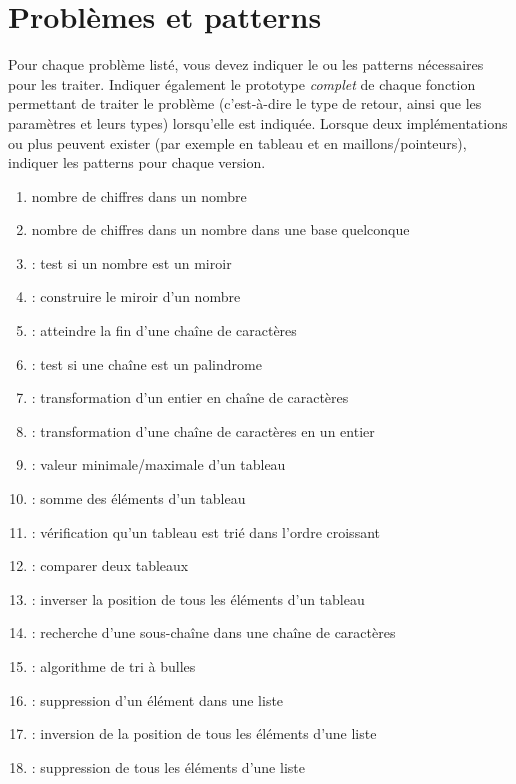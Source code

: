 \documentclass[11pt,a4paper]{article}
\begin{document}
\clearpage

\section{Problèmes et patterns}


Pour chaque problème listé, vous devez indiquer le ou les patterns nécessaires pour les traiter.
Indiquer également le prototype \textit{complet} de chaque fonction permettant de traiter le problème (c'est-à-dire le type de retour, ainsi que les paramètres et leurs types) lorsqu'elle est indiquée.
Lorsque deux implémentations ou plus peuvent exister (par exemple en tableau et en maillons/pointeurs), indiquer les patterns pour chaque version.

\bigskip

\begin{enumerate}
\item nombre de chiffres dans un nombre
\item nombre de chiffres dans un nombre dans une base quelconque
\item {} : test si un nombre est un miroir
\item {} : construire le miroir d'un nombre
\item {} : atteindre la fin d'une chaîne de caractères
\item {} : test si une chaîne est un palindrome
\item {} : transformation d'un entier en chaîne de caractères
\item {} : transformation d'une chaîne de caractères en un entier
\item {} : valeur minimale/maximale d'un tableau
\item {} : somme des éléments d'un tableau
\item {} : vérification qu'un tableau est trié dans l'ordre croissant
\item {} : comparer deux tableaux
\item {} : inverser la position de tous les éléments d'un tableau
\item {} : recherche d'une sous-chaîne dans une chaîne de caractères
\item {} : algorithme de tri à bulles
\item {} : suppression d'un élément dans une liste
\item {} : inversion de la position de tous les éléments d'une liste
\item {} : suppression de tous les éléments d'une liste
\end{enumerate}
\end{document}
